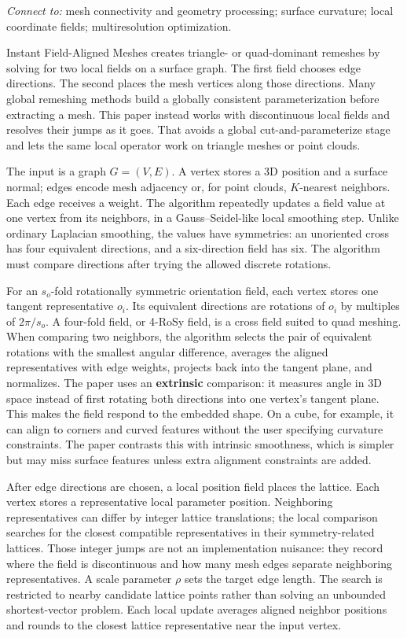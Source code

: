 \hypertarget{03-visual-computing-i-ch002-field-aligned-remeshing-without-a-global-parameterization}{}

\emph{Connect to:} mesh connectivity and geometry processing; surface curvature; local coordinate fields; multiresolution optimization.

Instant Field-Aligned Meshes creates triangle- or quad-dominant remeshes by solving for two local fields on a surface graph. The first field chooses edge directions. The second places the mesh vertices along those directions. Many global remeshing methods build a globally consistent parameterization before extracting a mesh. This paper instead works with discontinuous local fields and resolves their jumps as it goes. That avoids a global cut-and-parameterize stage and lets the same local operator work on triangle meshes or point clouds.

The input is a graph \(G=(V,E)\). A vertex stores a 3D position and a surface normal; edges encode mesh adjacency or, for point clouds, \(K\)-nearest neighbors. Each edge receives a weight. The algorithm repeatedly updates a field value at one vertex from its neighbors, in a Gauss--Seidel-like local smoothing step. Unlike ordinary Laplacian smoothing, the values have symmetries: an unoriented cross has four equivalent directions, and a six-direction field has six. The algorithm must compare directions after trying the allowed discrete rotations.

For an \(s_o\)-fold rotationally symmetric orientation field, each vertex stores one tangent representative \(o_i\). Its equivalent directions are rotations of \(o_i\) by multiples of \(2\pi/s_o\). A four-fold field, or 4-RoSy field, is a cross field suited to quad meshing. When comparing two neighbors, the algorithm selects the pair of equivalent rotations with the smallest angular difference, averages the aligned representatives with edge weights, projects back into the tangent plane, and normalizes. The paper uses an \textbf{extrinsic} comparison: it measures angle in 3D space instead of first rotating both directions into one vertex's tangent plane. This makes the field respond to the embedded shape. On a cube, for example, it can align to corners and curved features without the user specifying curvature constraints. The paper contrasts this with intrinsic smoothness, which is simpler but may miss surface features unless extra alignment constraints are added.

After edge directions are chosen, a local position field places the lattice. Each vertex stores a representative local parameter position. Neighboring representatives can differ by integer lattice translations; the local comparison searches for the closest compatible representatives in their symmetry-related lattices. Those integer jumps are not an implementation nuisance: they record where the field is discontinuous and how many mesh edges separate neighboring representatives. A scale parameter \(\rho\) sets the target edge length. The search is restricted to nearby candidate lattice points rather than solving an unbounded shortest-vector problem. Each local update averages aligned neighbor positions and rounds to the closest lattice representative near the input vertex.

